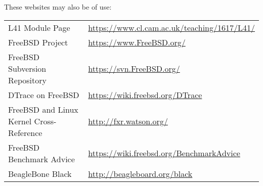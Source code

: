 \documentclass[a4paper,10pt]{article}
\begin{document}
These websites may also be of use:

\bigskip

\begin{tabular}{ll}
L41 Module Page & \url{https://www.cl.cam.ac.uk/teaching/1617/L41/} \\
FreeBSD Project & \url{https://www.FreeBSD.org/} \\
FreeBSD Subversion Repository & \url{https://svn.FreeBSD.org/} \\
DTrace on FreeBSD & \url{https://wiki.freebsd.org/DTrace} \\
FreeBSD and Linux Kernel Cross-Reference & \url{http://fxr.watson.org/} \\
FreeBSD Benchmark Advice & \url{https://wiki.freebsd.org/BenchmarkAdvice} \\
BeagleBone Black & \url{http://beagleboard.org/black} \\
\end{tabular}
\end{document}
